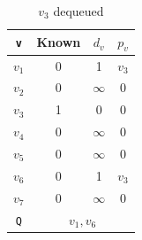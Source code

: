 \begin{minipage}{0.33\textwidth}
  \begin{table}[H]
    \centering
    \begin{tabular}{c|c|c|c}
        \toprule
        \verb|v| & Known & \(d_v\) & \(p_v\)  \\
      \midrule
        \(v_1\) & 0 & 1 & \(v_3\)  \\
        \(v_2\) & 0 & \(\infty\) & 0  \\
        \(v_3\) & 1 & 0 & 0  \\
        \(v_4\) & 0 & \(\infty\) & 0  \\
        \(v_5\) & 0 & \(\infty\) & 0  \\
        \(v_6\) & 0 & 1 & \(v_3\)  \\
        \(v_7\) & 0 & \(\infty\) & 0  \\
      \midrule
        \verb|Q| & \multicolumn{3}{c}{\(v_1, v_6\)} \\
      \bottomrule
    \end{tabular}
    \caption*{\(v_3\) dequeued}
  \end{table}
\end{minipage}

